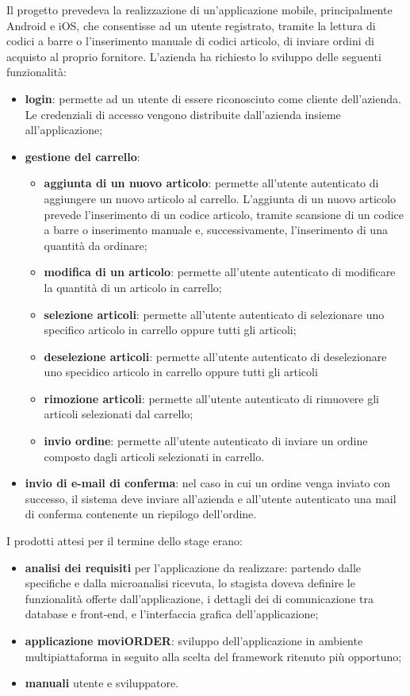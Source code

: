 Il progetto prevedeva la realizzazione di un'applicazione mobile, principalmente Android e iOS, che consentisse ad un utente registrato, tramite la lettura di codici a barre o l'inserimento manuale di codici articolo, di inviare ordini di acquisto al proprio fornitore. L'azienda ha richiesto lo sviluppo delle seguenti funzionalità:
\begin{itemize}
	\item \textbf{login}: permette ad un utente di essere riconosciuto come cliente dell'azienda. Le credenziali di accesso vengono distribuite dall'azienda insieme all'applicazione;
	\item \textbf{gestione del carrello}:
	\begin{itemize}
		\item \textbf{aggiunta di un nuovo articolo}: permette all'utente autenticato di aggiungere un nuovo articolo al carrello. L'aggiunta di un nuovo articolo prevede l'inserimento di un codice articolo, tramite scansione di un codice a barre o inserimento manuale e, successivamente, l'inserimento di una quantità da ordinare;
		\item \textbf{modifica di un articolo}: permette all'utente autenticato di modificare la quantità di un articolo in carrello;
		\item \textbf{selezione articoli}: permette all'utente autenticato di selezionare uno specifico articolo in carrello oppure tutti gli articoli;
		\item \textbf{deselezione articoli}: permette all'utente autenticato di deselezionare uno specidico articolo in carrello oppure tutti gli articoli
		\item \textbf{rimozione articoli}: permette all'utente autenticato di rimuovere gli articoli selezionati dal carrello;
		\item \textbf{invio ordine}: permette all'utente autenticato di inviare un ordine composto dagli articoli selezionati in carrello.
	\end{itemize}
	\item \textbf{invio di e-mail di conferma}: nel caso in cui un ordine venga inviato con successo, il sistema deve inviare all'azienda e all'utente autenticato una mail di conferma contenente un riepilogo dell'ordine.
\end{itemize}

I prodotti attesi per il termine dello stage erano:
\begin{itemize}
	\item \textbf{analisi dei requisiti} per l'applicazione da realizzare: partendo dalle specifiche e dalla microanalisi ricevuta, lo stagista doveva definire le funzionalità offerte dall'applicazione, i dettagli dei  di comunicazione tra database e front-end, e l'interfaccia grafica dell'applicazione;
	\item \textbf{applicazione moviORDER}: sviluppo dell'applicazione in ambiente multipiattaforma in seguito alla scelta del framework ritenuto più opportuno;
	\item \textbf{manuali} utente e sviluppatore. 
\end{itemize}

